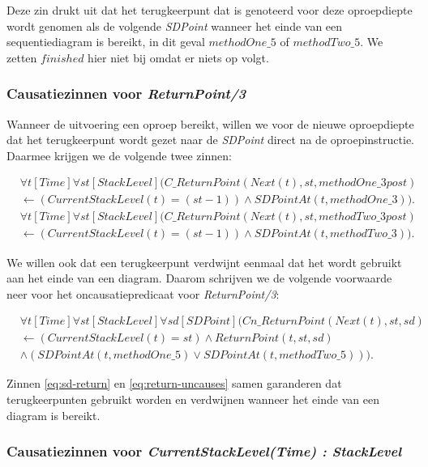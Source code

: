 Deze zin drukt uit dat het terugkeerpunt dat is genoteerd voor deze oproepdiepte wordt genomen als de volgende \textit{SDPoint} wanneer het einde van een sequentiediagram is bereikt, in dit geval $methodOne\_5$ of $methodTwo\_5$. We zetten $finished$ hier niet bij omdat er niets op volgt.

\subsubsection{Causatiezinnen voor \textit{ReturnPoint/3}}
Wanneer de uitvoering een oproep bereikt, willen we voor de nieuwe oproepdiepte dat het terugkeerpunt wordt gezet naar de \textit{SDPoint} direct na de oproepinstructie. Daarmee krijgen we de volgende twee zinnen:

\begin{align}
	\nonumber &\forall{t}[Time]\forall{st}[StackLevel](C\_ReturnPoint(Next(t), st, methodOne\_3post) \\ &\leftarrow (CurrentStackLevel(t) = (st-1)) \land SDPointAt(t, methodOne\_3)). \\
	\nonumber &\forall{t}[Time]\forall{st}[StackLevel](C\_ReturnPoint(Next(t), st, methodTwo\_3post) \\ &\leftarrow (CurrentStackLevel(t) = (st-1)) \land SDPointAt(t, methodTwo\_3)).
\end{align}

We willen ook dat een terugkeerpunt verdwijnt eenmaal dat het wordt gebruikt aan het einde van een diagram. Daarom schrijven we de volgende voorwaarde neer voor het oncausatiepredicaat voor \textit{ReturnPoint/3}:

\begin{align}
 \nonumber &\forall{t}[Time]\forall{st}[StackLevel]\forall{sd}[SDPoint](Cn\_ReturnPoint(Next(t), st, sd) \\ \nonumber &\leftarrow (CurrentStackLevel(t) = st) \land ReturnPoint(t, st, sd) \\ &\land (SDPointAt(t, methodOne\_5) \lor SDPointAt(t, methodTwo\_5))).\label{eq:return-uncauses}
\end{align}

Zinnen \ref{eq:sd-return} en \ref{eq:return-uncauses} samen garanderen dat terugkeerpunten gebruikt worden en verdwijnen wanneer het einde van een diagram is bereikt.

\subsubsection{Causatiezinnen voor \textit{CurrentStackLevel(Time) : StackLevel}}

